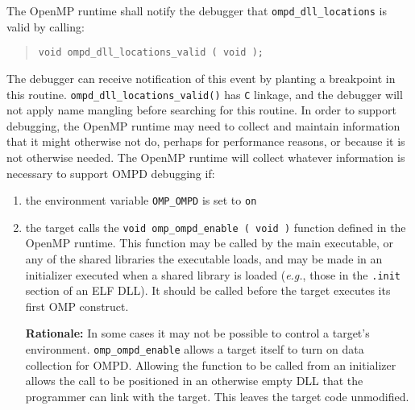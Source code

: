 The OpenMP runtime shall notify the debugger that
\texttt{ompd\_dll\_locations} is valid by calling:
\begin{quote}
\begin{lstlisting}
void ompd_dll_locations_valid ( void );
\end{lstlisting}
\end{quote}

\noindent
The debugger can receive notification of this event by planting
a breakpoint in this routine.
\texttt{ompd\_dll\_locations\_valid()} has \texttt{C} linkage,
and the debugger will not apply name mangling before searching
for this routine.
In order to support debugging, the OpenMP runtime may need to collect
and maintain information that it might otherwise not do, perhaps
for performance reasons, or because it is not otherwise needed.
The OpenMP runtime will collect whatever information is necessary
to support OMPD debugging if:
\begin{enumerate}
\item
  the environment variable \texttt{OMP\_OMPD} is set to \texttt{on}
\item
  the target calls the
  \texttt{void omp\_ompd\_enable~(~void~)}
  function defined in the OpenMP runtime.
  This function may be called by the main executable, or any of the
  shared libraries the executable loads, and may be made in an
  initializer executed when a shared library is loaded
  (\textit{e.g.}, those in the \texttt{.init} section of an ELF DLL).
  It should be called before the target executes its first OMP
  construct.

  \textbf{Rationale:}
  In some cases it may not be possible to control a target's
  environment.
  \texttt{omp\_ompd\_enable} allows a target itself to turn on
  data collection for OMPD.
  Allowing the function to be called from an initializer allows
  the call to be positioned in an otherwise empty DLL that the
  programmer can link with the target.
  This leaves the target code unmodified.
\end{enumerate}


